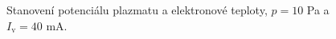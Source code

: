 \documentclass[a4paper,12pt]{article}
\begin{document}
\begin{figure}[h]
	\centering
	\begin{subfigure}[b]{.49\textwidth}
		\centering
	\end{subfigure}
	\begin{subfigure}[b]{.49\textwidth}
		\centering
	\end{subfigure}
	\caption{Stanovení potenciálu plazmatu a elektronové teploty, $p = 10$ \si{\pascal} a $I_\text{v} = 40$ \si{\milli\ampere}.}
	\label{data6}
\end{figure}
\end{document}
